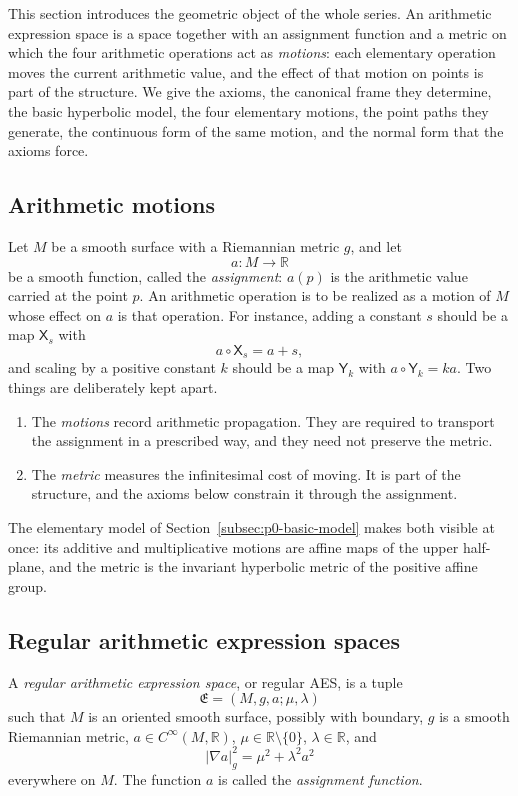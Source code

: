 This section introduces the geometric object of the whole series.  An arithmetic
expression space is a space together with an assignment function and a metric on
which the four arithmetic operations act as \emph{motions}: each elementary
operation moves the current arithmetic value, and the effect of that motion on
points is part of the structure.  We give the axioms, the canonical frame they
determine, the basic hyperbolic model, the four elementary motions, the point
paths they generate, the continuous form of the same motion, and the normal form
that the axioms force.

\subsection{Arithmetic motions}

Let $M$ be a smooth surface with a Riemannian metric $g$, and let
\[
  a:M\longrightarrow\mathbb R
\]
be a smooth function, called the \emph{assignment}: $a(p)$ is the arithmetic
value carried at the point $p$.  An arithmetic operation is to be realized as a
motion of $M$ whose effect on $a$ is that operation.  For instance, adding a
constant $s$ should be a map $\mathsf X_s$ with
\[
  a\circ\mathsf X_s=a+s,
\]
and scaling by a positive constant $k$ should be a map $\mathsf Y_k$ with
$a\circ\mathsf Y_k=ka$.  Two things are deliberately kept apart.

\begin{enumerate}
  \item The \emph{motions} record arithmetic propagation.  They are required to
  transport the assignment in a prescribed way, and they need not preserve the
  metric.
  \item The \emph{metric} measures the infinitesimal cost of moving.  It is part
  of the structure, and the axioms below constrain it through the assignment.
\end{enumerate}

The elementary model of Section~\ref{subsec:p0-basic-model} makes both visible at
once: its additive and multiplicative motions are affine maps of the upper
half-plane, and the metric is the invariant hyperbolic metric of the positive
affine group.

\subsection{Regular arithmetic expression spaces}

\begin{definition}\label{def:regular-aes}
A \emph{regular arithmetic expression space}, or regular AES, is a tuple
\[
 \mathfrak E=(M,g,a;\mu,\lambda)
\]
such that $M$ is an oriented smooth surface, possibly with boundary, $g$ is a smooth Riemannian
metric, $a\in C^\infty(M,\mathbb R)$, $\mu\in\mathbb R\setminus\{0\}$,
$\lambda\in\mathbb R$, and
\begin{equation}\label{eq:regular-aes-eikonal}
 |\nabla a|_g^2=\mu^2+\lambda^2a^2
\end{equation}
everywhere on $M$.  The function $a$ is called the
\emph{assignment function}.
\end{definition}

